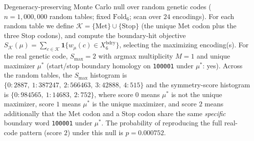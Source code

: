 Degeneracy-preserving Monte Carlo null over random genetic codes ($n=1,000,000$ random tables; fixed $\mathrm{Fold}_6$; scan over $24$ encodings). For each random table we define $\mathcal{K}=\{\mathrm{Met}\}\cup\{\mathrm{Stop}\}$ (the unique Met codon plus the three Stop codons), and compute the boundary-hit objective $S_{\mathcal{K}}(\mu)=\sum_{c\in\mathcal{K}}\mathbf{1}\{w_\mu(c)\in X_6^{\mathrm{bdry}}\}$, selecting the maximizing encoding(s). For the real genetic code, $S_{\mathrm{max}}=2$ with argmax multiplicity $M=1$ and unique maximizer $\mu^\ast$ (start/stop boundary homology on \texttt{100001} under $\mu^\ast$: yes). Across the random tables, the $S_{\mathrm{max}}$ histogram is $\{0:2887,\ 1:387247,\ 2:566463,\ 3:42888,\ 4:515\}$ and the symmetry-score histogram is $\{0:984565,\ 1:14683,\ 2:752\}$, where score $0$ means $\mu^\ast$ is not the unique maximizer, score $1$ means $\mu^\ast$ is the unique maximizer, and score $2$ means additionally that the Met codon and a Stop codon share the same \emph{specific} boundary word \texttt{100001} under $\mu^\ast$. The probability of reproducing the full real-code pattern (score $2$) under this null is $p=0.000752$.
